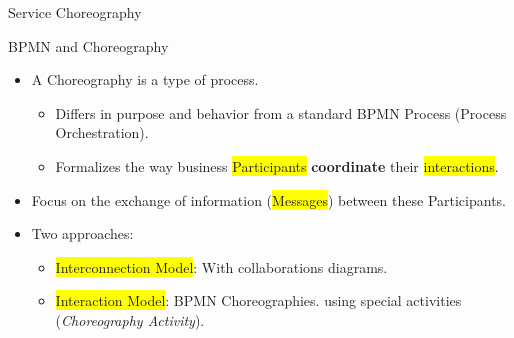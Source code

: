 \documentclass[xcolor=svgnames]{beamer}
\begin{document}
\begin{frame}{Service Choreography}
{\begin{figure}[!h]
              \end{figure}	
          }
    \end{frame}




  \begin{frame}{BPMN and Choreography}
    \begin{itemize}
      \item <1-> A Choreography is a type of process.
	\begin{itemize}
	  \item Differs in purpose and behavior from a standard BPMN Process (Process Orchestration). 
	  \item Formalizes the way business \colorbox{yellow}{Participants} \textbf{coordinate} their \colorbox{yellow}{interactions}.
	\end{itemize}
      \item <2-> Focus on the exchange of information (\colorbox{yellow}{Messages}) between these Participants.
      \item <3-> Two approaches:
	\begin{itemize}
	  \item <4-> \colorbox{yellow}{Interconnection Model}: With collaborations diagrams. 
	  \item <5-> \colorbox{yellow}{Interaction Model}:  BPMN Choreographies. using special activities (\textit{Choreography Activity}). 
	\end{itemize}
    \end{itemize}
    
  \end{frame}
\end{document}

